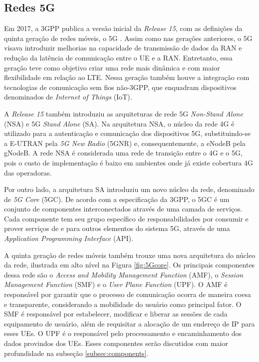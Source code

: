 \subsection{Redes 5G}

Em 2017, a 3GPP publica a versão inicial da \textit{Release 15}, com as definições da quinta geração de redes móveis, o 5G \cite{3gpp.21.205}.
Assim como nas gerações anteriores, o 5G visava introduzir melhorias na capacidade de transmissão de dados da RAN e redução da latência de comunicação entre o UE e a RAN.
Entretanto, essa geração teve como objetivo criar uma rede mais dinâmica e com maior flexibilidade em relação ao LTE.
Nessa geração também houve a integração com tecnologias de comunicação sem fios não-3GPP, que enquadram dispositivos denominados de \textit{Internet of Things} (IoT).

A \textit{Release 15} também introduziu as arquiteturas de rede 5G \textit{Non-Stand Alone} (NSA) e 5G \textit{Stand Alone} (SA).
Na arquitetura NSA, o núcleo da rede 4G é utilizado para a autenticação e comunicação dos dispositivos 5G, substituindo-se a E-UTRAN pela \textit{5G New Radio} (5GNR) e, consequentemente, a eNodeB pela gNodeB.
A rede NSA é considerada uma rede de transição entre o 4G e o 5G, pois o custo de implementação é baixo em ambientes onde já existe cobertura 4G das operadoras.

Por outro lado, a arquitetura SA introduziu um novo núcleo da rede, denominado de \textit{5G Core} (5GC).
De acordo com a especificação da 3GPP, o 5GC é um conjunto de componentes interconectados através de uma camada de serviços. Cada componente tem seu grupo específico de responsabilidades por consumir e prover serviços de e para outros elementos do sistema 5G, através de uma \textit{Application Programming Interface} (API).

A quinta geração de redes móveis também trouxe uma nova arquitetura do núcleo da rede, ilustrada em alto nível na Figura \ref{fig:5Gcore}. Os principais componentes dessa rede são o \textit{Access and Mobility Management Function} (AMF), o \textit{Session Management Function} (SMF) e o \textit{User Plane Function} (UPF).
O AMF é responsável por garantir que o processo de comunicação ocorra de maneira coesa e transparente, considerando a mobilidade do usuário como principal fator.
O SMF é responsável por estabelecer, modificar e liberar as sessões de cada equipamento de usuário, além de requisitar a alocação de um endereço de IP para esses UEs.
O UPF é o responsável pelo processamento e encaminhamento dos dados provindos dos UEs. Esses componentes serão discutidos com maior profundidade na subseção \ref{subsec:components}.

